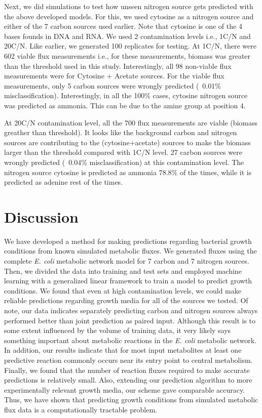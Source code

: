 \documentclass[12pt]{article}
\begin{document}
Next, we did simulations to test how unseen nitrogen source gets predicted with the above developed models. For this, we used cytosine as a nitrogen source and either of the 7 carbon sources used earlier. Note that cytosine is one of the 4 bases founds in DNA and RNA. We used 2 contamination levels i.e., 1C/N and 20C/N. Like earlier, we generated 100 replicates for testing. At 1C/N, there were 602 viable flux measurements i.e., for these measurements, biomass was greater than the threshold used in this study. Interestingly, all 98 non-viable flux measurements were for Cytosine + Acetate sources. For the viable flux measurements, only 5 carbon sources were wrongly predicted (~0.01\% misclassification). Interestingly, in all the 100\% cases, cytosine nitrogen source was predicted as ammonia. This can be due to the amine group at position 4.

At 20C/N contamination level, all the 700 flux measurements are viable (biomass greather than threshold). It looks like the background carbon and nitrogen sources are contributing to the (cytosine+acetate) sources to make the biomass larger than the threshold compared with 1C/N level. 27 carbon sources were wrongly predicted (~0.04\% misclassification) at this contamination level. The nitrogen source cytosine is predicted as ammonia 78.8\% of the times, while it is predicted as adenine rest of the times. 

\section*{Discussion}

We have developed a method for making predictions regarding bacterial growth conditions from known simulated metabolic fluxes. We generated fluxes using the complete \emph{E. coli} metabolic network model for 7 carbon and 7 nitrogen sources. Then, we divided the data into training and test sets and employed machine learning with a generalized linear framework to train a model to predict growth conditions. We found that even at high contamination levels, we could make reliable predictions regarding growth media for all of the sources we tested. Of note, our data indicates separately predicting carbon and nitrogen sources always performed better than joint prediction as paired input. Although this result is to some extent influenced by the volume of training data, it very likely says something important about metabolic reactions in the \emph{E. coli} metabolic network. In addition, our results indicate that for most input metabolites at least one predictive reaction commonly occurs near its entry point to central metabolism. Finally, we found that the number of reaction fluxes required to make accurate predictions is relatively small. Also, extending our prediction algorithm to more experimentally relevant growth media, our scheme gave comparable accuracy. Thus, we have shown that predicting growth conditions from simulated metabolic flux data is a computationally tractable problem.
\end{document}
